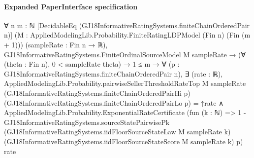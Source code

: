 \documentclass[10pt]{article}
\begin{document}
\paragraph{Expanded PaperInterface specification}
\begin{ReviewVerbatim}
∀ {n m : ℕ} [DecidableEq (GJ18InformativeRatingSystems.finiteChainOrderedPair n)]
  (M : AppliedModelingLib.Probability.FiniteRatingLDPModel (Fin n) (Fin (m + 1))) (sampleRate : Fin n → ℝ),
  GJ18InformativeRatingSystems.FiniteOrdinalSourceModel M sampleRate →
    (∀ (theta : Fin n), 0 < sampleRate theta) →
      1 ≤ m →
        ∀ (p : GJ18InformativeRatingSystems.finiteChainOrderedPair n),
          ∃ (rate : ℝ),
            AppliedModelingLib.Probability.pairwiseSellerThresholdRateTop M sampleRate
                  (GJ18InformativeRatingSystems.finiteChainOrderedPairHi p)
                  (GJ18InformativeRatingSystems.finiteChainOrderedPairLo p) =
                ↑rate ∧
              AppliedModelingLib.Probability.ExponentialRateCertificate
                (fun (k : ℕ) =>
                  1 -
                    GJ18InformativeRatingSystems.sourceStatePairwisePk
                      (GJ18InformativeRatingSystems.iidFloorSourceStateLaw M sampleRate k)
                      (GJ18InformativeRatingSystems.iidFloorSourceStateScore M sampleRate k) p)
                rate
\end{ReviewVerbatim}
\end{document}
